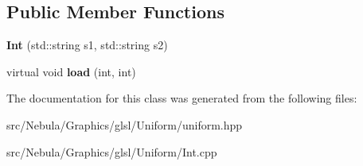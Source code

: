 \subsection*{\-Public \-Member \-Functions}
\begin{DoxyCompactItemize}
\item 
\hypertarget{classNeb_1_1glsl_1_1Uniform_1_1Vector_1_1Int_a48b39d8547200b58574b24e47a921979}{{\bfseries \-Int} (std\-::string s1, std\-::string s2)}\label{classNeb_1_1glsl_1_1Uniform_1_1Vector_1_1Int_a48b39d8547200b58574b24e47a921979}

\item 
\hypertarget{classNeb_1_1glsl_1_1Uniform_1_1Vector_1_1Int_ad6b47e720ddda93b9c31ea544c28a3d6}{virtual void {\bfseries load} (int, int)}\label{classNeb_1_1glsl_1_1Uniform_1_1Vector_1_1Int_ad6b47e720ddda93b9c31ea544c28a3d6}

\end{DoxyCompactItemize}


\-The documentation for this class was generated from the following files\-:\begin{DoxyCompactItemize}
\item 
src/\-Nebula/\-Graphics/glsl/\-Uniform/uniform.\-hpp\item 
src/\-Nebula/\-Graphics/glsl/\-Uniform/\-Int.\-cpp\end{DoxyCompactItemize}
